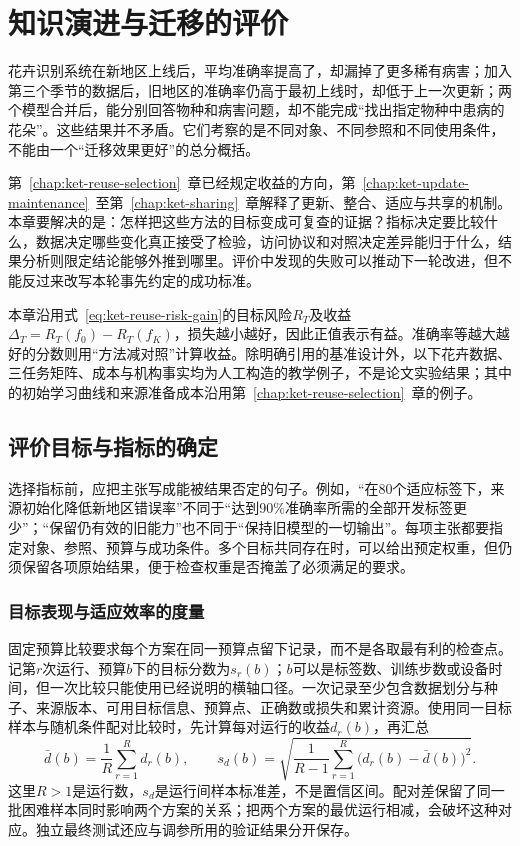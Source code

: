 \chapter{知识演进与迁移的评价}
\label{chap:ket-evaluation}

花卉识别系统在新地区上线后，平均准确率提高了，却漏掉了更多稀有病害；加入第三个季节的数据后，旧地区的准确率仍高于最初上线时，却低于上一次更新；两个模型合并后，能分别回答物种和病害问题，却不能完成“找出指定物种中患病的花朵”。这些结果并不矛盾。它们考察的是不同对象、不同参照和不同使用条件，不能由一个“迁移效果更好”的总分概括。

第~\ref{chap:ket-reuse-selection}~章已经规定收益的方向，第~\ref{chap:ket-update-maintenance}~至第~\ref{chap:ket-sharing}~章解释了更新、整合、适应与共享的机制。本章要解决的是：怎样把这些方法的目标变成可复查的证据？指标决定要比较什么，数据决定哪些变化真正接受了检验，访问协议和对照决定差异能归于什么，结果分析则限定结论能够外推到哪里。评价中发现的失败可以推动下一轮改进，但不能反过来改写本轮事先约定的成功标准。

本章沿用式~\eqref{eq:ket-reuse-risk-gain}的目标风险$R_T$及收益$\Delta_T=R_T(f_0)-R_T(f_K)$，损失越小越好，因此正值表示有益。准确率等越大越好的分数则用“方法减对照”计算收益。除明确引用的基准设计外，以下花卉数据、三任务矩阵、成本与机构事实均为人工构造的教学例子，不是论文实验结果；其中的初始学习曲线和来源准备成本沿用第~\ref{chap:ket-reuse-selection}~章的例子。

\section{评价目标与指标的确定}
\label{sec:ket-evaluation-metrics}

选择指标前，应把主张写成能被结果否定的句子。例如，“在80个适应标签下，来源初始化降低新地区错误率”不同于“达到90\%准确率所需的全部开发标签更少”；“保留仍有效的旧能力”也不同于“保持旧模型的一切输出”。每项主张都要指定对象、参照、预算与成功条件。多个目标共同存在时，可以给出预定权重，但仍须保留各项原始结果，便于检查权重是否掩盖了必须满足的要求。

\subsection{目标表现与适应效率的度量}
\label{sec:ket-evaluation-target}

固定预算比较要求每个方案在同一预算点留下记录，而不是各取最有利的检查点。记第$r$次运行、预算$b$下的目标分数为$s_r(b)$；$b$可以是标签数、训练步数或设备时间，但一次比较只能使用已经说明的横轴口径。一次记录至少包含数据划分与种子、来源版本、可用目标信息、预算点、正确数或损失和累计资源。使用同一目标样本与随机条件配对比较时，先计算每对运行的收益$d_r(b)$，再汇总
\begin{equation}
  \bar d(b)=\frac1R\sum_{r=1}^{R}d_r(b),\qquad
  s_d(b)=\sqrt{\frac{1}{R-1}
    \sum_{r=1}^{R}\bigl(d_r(b)-\bar d(b)\bigr)^2}.
  \label{eq:ket-evaluation-run-summary}
\end{equation}
这里$R>1$是运行数，$s_d$是运行间样本标准差，不是置信区间。配对差保留了同一批困难样本同时影响两个方案的关系；把两个方案的最优运行相减，会破坏这种对应。独立最终测试还应与调参所用的验证结果分开保存。

